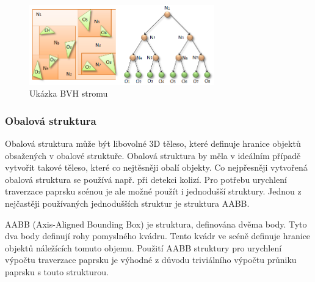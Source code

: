 \documentclass[czech,master]{diploma}
\begin{document}
\begin{figure}[ht]%
  \centering
  \includegraphics[width=8cm]{Figures/bvh.png}%
  \caption{Ukázka BVH stromu\cite{BVH}}%
  \label{fig:bvh}%
\end{figure}

\subsubsection{Obalová struktura}
Obalová struktura může být libovolné 3D těleso, které definuje hranice objektů obsažených v obalové struktuře. Obalová struktura by měla v ideálním případě vytvořit takové těleso, které co nejtěsněji obalí objekty. Co nejpřesněji vytvořená obalová struktura se používá např. při detekci kolizí. Pro potřebu urychlení traverzace paprsku scénou je ale možné použít i jednodušší struktury. Jednou z nejčastěji používaných jednodušších struktur je struktura AABB. \par
AABB (Axis-Aligned Bounding Box) je struktura, definována dvěma body. Tyto dva body definují rohy pomyslného kvádru. Tento kvádr ve scéně definuje hranice objektů náležících tomuto objemu. Použití AABB struktury pro urychlení výpočtu traverzace paprsku je výhodné z důvodu triviálního výpočtu průniku paprsku s touto strukturou.
\end{document}
